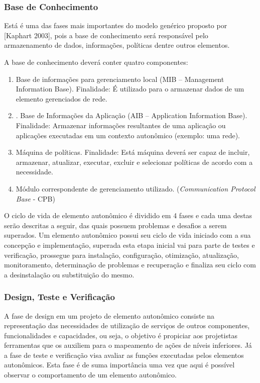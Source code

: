 \documentclass[11pt,twoside]{article}
\begin{document}
\subsubsection{Base de Conhecimento}
Está é uma das fases mais importantes do modelo genérico proposto por [Kaphart 2003], pois a base de conhecimento será responsável pelo armazenamento de dados, informações, políticas dentre outros elementos.

A base de conhecimento deverá conter quatro componentes: 
\begin{enumerate}

\item	Base de informações para gerenciamento local (MIB – Management Information Base).
Finalidade: É utilizado para o armazenar dados de um elemento gerenciados de rede.

\item.	Base de Informações da Aplicação (AIB – Application Information Base).
Finalidade: Armazenar informações resultantes de uma aplicação ou aplicações executadas em um contexto autonômico (exemplo: uma rede).

\item Máquina de políticas. 
Finalidade: Está máquina deverá ser capaz de incluir, armazenar, atualizar, executar, excluir e selecionar políticas de acordo com a necessidade.

\item Módulo correspondente de gerenciamento utilizado. (\textit{Communication Protocol Base} - CPB)
\end{enumerate}

O ciclo de vida de elemento autonômico é dividido em 4 fases e cada uma destas serão descritas a seguir, das quais possuem problemas e desafios a serem superados. Um elemento autonômico possui seu ciclo de vida iniciado com a sua concepção e implementação, superada esta etapa inicial vai para parte de testes e verificação, prossegue para instalação, configuração, otimização, atualização, monitoramento, determinação de problemas e recuperação e finaliza seu ciclo com a desinstalação ou substituição do mesmo.

\subsubsection{Design, Teste e Verificação}
A fase de design em um projeto de elemento autonômico consiste na representação das necessidades de utilização de serviços de outros componentes, funcionalidades e capacidades, ou seja, o objetivo é propiciar aos projetistas ferramentas que os auxiliem para o mapeamento de ações de níveis inferiores. Já a fase de teste e verificação visa avaliar as funções executadas pelos elementos autonômicos. Esta fase é de suma importância uma vez que aqui é possível observar o comportamento de um elemento autonômico.
\end{document}
